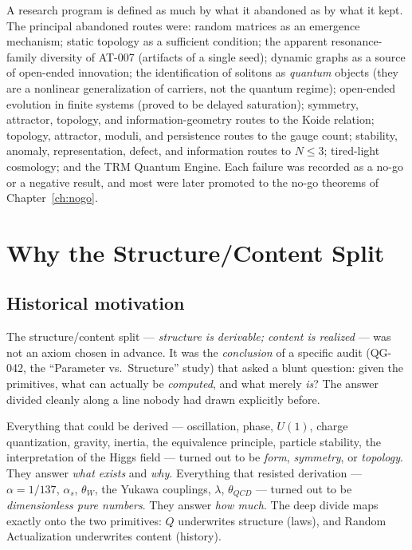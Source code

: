 \documentclass[10pt,twoside,openany]{book}
\begin{document}
A research program is defined as much by what it abandoned as by what it kept. The
principal abandoned routes were: random matrices as an emergence mechanism; static
topology as a sufficient condition; the apparent resonance-family diversity of AT-007
(artifacts of a single seed); dynamic graphs as a source of open-ended innovation; the
identification of solitons as \emph{quantum} objects (they are a nonlinear generalization
of carriers, not the quantum regime); open-ended evolution in finite systems (proved to be
delayed saturation); symmetry, attractor, topology, and information-geometry routes to the
Koide relation; topology, attractor, moduli, and persistence routes to the gauge count;
stability, anomaly, representation, defect, and information routes to $N\le3$; tired-light
cosmology; and the TRM Quantum Engine. Each failure was recorded as a no-go or a negative
result, and most were later promoted to the no-go theorems of Chapter~\ref{ch:nogo}.

\chapter{Why the Structure/Content Split}
\label{ch:split}

\section{Historical motivation}

The structure/content split --- \emph{structure is derivable; content is realized} --- was
not an axiom chosen in advance. It was the \emph{conclusion} of a specific audit
(QG-042, the ``Parameter vs.\ Structure'' study) that asked a blunt question: given the
primitives, what can actually be \emph{computed}, and what merely \emph{is}? The answer
divided cleanly along a line nobody had drawn explicitly before.

Everything that could be derived --- oscillation, phase, $U(1)$, charge quantization,
gravity, inertia, the equivalence principle, particle stability, the interpretation of the
Higgs field --- turned out to be \emph{form}, \emph{symmetry}, or \emph{topology}. They
answer \emph{what exists} and \emph{why}. Everything that resisted derivation ---
$\alpha=1/137$, $\alpha_s$, $\theta_W$, the Yukawa couplings, $\lambda$, $\theta_{QCD}$ ---
turned out to be \emph{dimensionless pure numbers}. They answer \emph{how much}. The deep
divide maps exactly onto the two primitives: $Q$ underwrites structure (laws), and Random
Actualization underwrites content (history).
\end{document}
